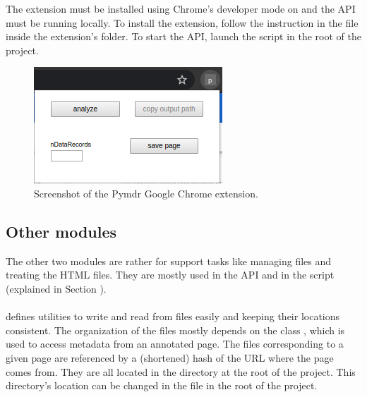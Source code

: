 \documentclass[10pt]{article}
\begin{document}
The extension must be installed using Chrome's developer mode on and the API must be running locally. To install the extension, follow the instruction in the  file inside the extension's folder\footnotemark. To start the API, launch the script  in the root of the project\footnotemark.



\begin{figure}[H]
    \centering
    \includegraphics[width=0.45\linewidth]{fig/pymdr-extension.png}
    \caption{Screenshot of the Pymdr Google Chrome extension.}
    \label{fig:chrome-extension}
\end{figure}



\subsection{Other modules} \label{txt:other-modules}

The other two modules are rather for support tasks like managing files and treating the HTML files. They are mostly used in the API and in the script  (explained in Section ). 

\paragraph{} 

defines utilities to write and read from files easily and keeping their locations consistent. The organization of the files mostly depends on the class , which is used to access metadata from an annotated page. The files corresponding to a given page are referenced by a (shortened) hash of the URL where the page comes from. They are all located in the directory  at the root of the project. This directory's location can be changed in the file  in the root of the project.
\end{document}
